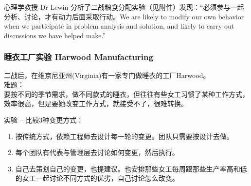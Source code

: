 
心理学教授 Dr Lewin
分析了二战粮食分配实验（见附件）发现：``必须参与一起分析、讨论，才有动力后面采取行动。We
are likely to modify our own behavior when we participate in problem
analysis and solution, and likely to carry out discussions we have
helped make.''


\hypertarget{ux7761ux8863ux5de5ux5382ux5b9eux9a8c-harwood-manufacturing}{%
\subsubsection{睡衣工厂实验 Harwood
Manufacturing}\label{ux7761ux8863ux5de5ux5382ux5b9eux9a8c-harwood-manufacturing}}

二战后，在维京尼亚州(Virginia)有一家专门做睡衣的工厂Harwood。\\
难题：\\
要按不同的季节需求，做不同款式的睡衣，但往往有些女工习惯了某种工作方式，效率很高，但是要她改变工作方式，就接受不了，很难转换。

实验 -- 比较3种变更方式：\\

\begin{enumerate}
\tightlist
\item
  按传统方式，依赖工程师去设计每一轮的变更。团队只需要按设计去做。
\item
  每个团队有代表与管理层去讨论如何变更，然后执行。
\item
  自己去策划自己的变更，也提建议。也安排那些女工每周跟那些生产率高和低的女工一起讨论不同方式的优劣，自己讨论怎么改变。
\end{enumerate}

